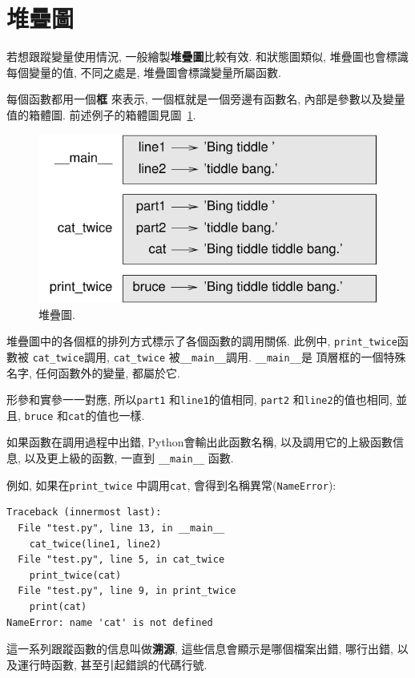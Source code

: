 \documentclass[10pt]{book}
\begin{document}
\section{堆疊圖}
\label{stackdiagram}
若想跟蹤變量使用情況, 一般繪製{\bf 堆疊圖}比較有效. 
和狀態圖類似, 堆疊圖也會標識每個變量的值, 不同之處是, 
堆疊圖會標識變量所屬函數. 

每個函數都用一個{\bf 框} 來表示, 一個框就是一個旁邊有函數名, 
內部是參數以及變量值的箱體圖. 
前述例子的箱體圖見圖~\ref{fig.stack}. 

\begin{figure}
\centerline
{\includegraphics[scale=0.8]{figs/stack.pdf}}
\caption{堆疊圖.}
\label{fig.stack}
\end{figure}

堆疊圖中的各個框的排列方式標示了各個函數的調用關係. 
此例中, \verb"print_twice"函數被 \verb"cat_twice"調用, 
\verb"cat_twice" 被\verb"__main__"調用. \verb"__main__"是
頂層框的一個特殊名字, 任何函數外的變量, 都屬於它. 

形參和實參一一對應, 所以{\tt part1} 和{\tt line1}的值相同, 
{\tt part2} 和{\tt line2}的值也相同, 並且, 
 {\tt bruce} 和{\tt cat}的值也一樣. 

如果函數在調用過程中出錯, Python會輸出此函數名稱, 
以及調用它的上級函數信息, 以及更上級的函數, 一直到 \verb"__main__" 函數.

例如, 如果在\verb"print_twice" 中調用{\tt cat}, 會得到名稱異常({\tt NameError}):

\begin{verbatim}
Traceback (innermost last):
  File "test.py", line 13, in __main__
    cat_twice(line1, line2)
  File "test.py", line 5, in cat_twice
    print_twice(cat)
  File "test.py", line 9, in print_twice
    print(cat)
NameError: name 'cat' is not defined
\end{verbatim}
%
這一系列跟蹤函數的信息叫做{\bf 溯源}, 這些信息會顯示是哪個檔案出錯, 哪行出錯, 
以及運行時函數, 甚至引起錯誤的代碼行號. 
\end{document}
